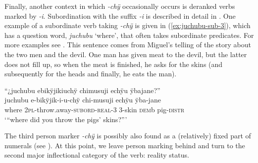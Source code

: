 Finally, another context in which \textit{-chÿ} occasionally occurs is deranked verbs marked by \textit{-i}. Subordination with the suffix \textit{-i} is described in detail in . One example of a subordinate verb taking \textit{-chÿ} is given in (\ref{ex:juchubu-sub-3}), which has a question word, \textit{juchubu} ‘where’, that often takes subordinate predicates. For more examples see . This sentence comes from Miguel’s telling of the story about the two men and the devil. One man has given meat to the devil, but the latter does not fill up, so when the meat is finished, he asks for the skins (and subsequently for the heads and finally, he eats the man).


\ea\label{ex:juchubu-sub-3}
\begingl 
\glpreamble “¿juchubu ebikÿjikiuchÿ chimusuji echÿu ÿbajane?”\\
\gla juchubu e-bikÿjik-i-u-chÿ chi-musuji echÿu ÿba-jane\\ 
\glb where 2\textsc{pl}-throw.away-\textsc{subord}-\textsc{real}-3 3-skin \textsc{dem}b pig-\textsc{distr}\\ 
\glft ‘“where did you throw the pigs’ skins?”’\\ 
\endgl
\trailingcitation{[mxx-n101017s-1.055-056]}
\xe


The third person marker \textit{-chÿ} is possibly also found as a (relatively) fixed part of numerals (see ). At this point, we leave person marking behind and turn to the second major inflectional category of the verb: reality status.

